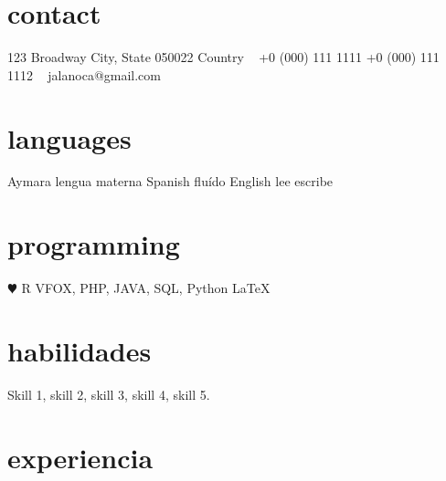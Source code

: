 \documentclass[]{cv-style}          %
\begin{document}
\lastupdated

\begin{aside}
%
\section{contact}
123 Broadway
City, State 050022
Country
~
+0 (000) 111 1111
+0 (000) 111 1112
~
jalanoca@gmail.com
%
\section{languages}
Aymara lengua materna
Spanish fluído
English lee escribe
%
\section{programming}
{\color{red} $\varheartsuit$} R
VFOX, PHP, JAVA, SQL, Python
\LaTeX{}
%
\end{aside}


\section{habilidades}
  \vspace{-0.2cm}

Skill 1, skill 2, skill 3, skill 4, skill 5.


\section{experiencia}
\end{document}
